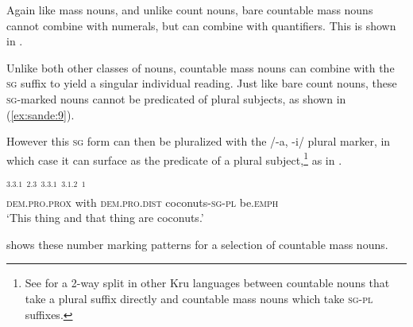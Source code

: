 \documentclass[output=paper,colorlinks,citecolor=brown]{langscibook}
\begin{document}
Again like mass nouns, and unlike count nouns, bare countable mass nouns cannot combine with numerals, but can combine with quantifiers. This is shown in .

\ea%
    \label{ex:sande:8}
    \z
\z

Unlike both other classes of nouns, countable mass nouns can combine with the \textsc{sg} suffix to yield a singular individual reading. Just like bare count nouns, these \textsc{sg}-marked nouns cannot be predicated of plural subjects, as shown in (\ref{ex:sande:9}).

\z

However this \textsc{sg} form can then be pluralized with the /-a, -i/ plural marker, in which case it can surface as the predicate of a plural subject,\footnote{See \citet[88--89]{Marchese1979} for a 2-way split in other Kru languages between countable nouns that take a plural suffix directly and countable mass nouns which take \textsc{sg}-\textsc{pl} suffixes.} as in .

\ea%
    \label{ex:sande:10}
    \gll    {}$^{3.3.1}$ $^{2.3}$ $^{3.3.1}$ $^{3.1.2}$ $^{1}$\\
	        \textsc{dem.pro.prox} with \textsc{dem.pro.dist} coconuts\textsc{-sg-pl} be.\textsc{emph}\\
	\glt    `This thing and that thing are coconuts.'
\z

 shows these number marking patterns for a selection of countable mass nouns.
\end{document}
